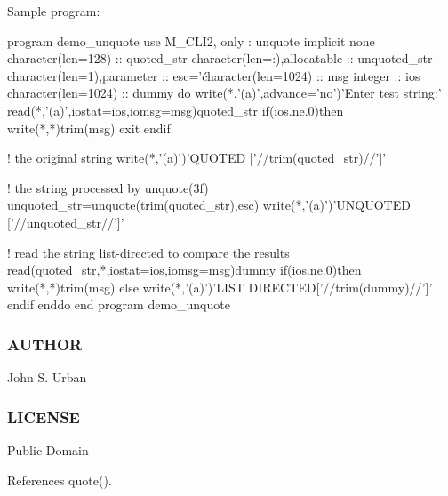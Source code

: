 Sample program\+: \begin{DoxyVerb}  program demo_unquote
  use M_CLI2, only : unquote
  implicit none
  character(len=128)           :: quoted_str
  character(len=:),allocatable :: unquoted_str
  character(len=1),parameter   :: esc='\'
  character(len=1024)          :: msg
  integer                      :: ios
  character(len=1024)          :: dummy
  do
     write(*,'(a)',advance='no')'Enter test string:'
     read(*,'(a)',iostat=ios,iomsg=msg)quoted_str
     if(ios.ne.0)then
        write(*,*)trim(msg)
        exit
     endif

     ! the original string
     write(*,'(a)')'QUOTED       ['//trim(quoted_str)//']'

     ! the string processed by unquote(3f)
     unquoted_str=unquote(trim(quoted_str),esc)
     write(*,'(a)')'UNQUOTED     ['//unquoted_str//']'

     ! read the string list-directed to compare the results
     read(quoted_str,*,iostat=ios,iomsg=msg)dummy
     if(ios.ne.0)then
        write(*,*)trim(msg)
     else
        write(*,'(a)')'LIST DIRECTED['//trim(dummy)//']'
     endif
  enddo
  end program demo_unquote
\end{DoxyVerb}


\subsubsection*{A\+U\+T\+H\+OR}

John S. Urban \subsubsection*{L\+I\+C\+E\+N\+SE}

Public Domain 

References quote().

